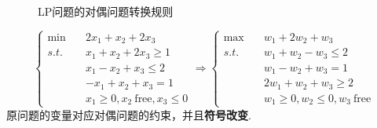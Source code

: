 \begin{remark}
\begin{itemize}
\begin{figure}[htbp]
            \caption{LP问题的对偶问题转换规则 \label{fig2}}
        \end{figure}
        \[\begin{cases}
            \min \quad & 2x_1 + x_2 + 2x_3\\
            s.t. \quad & x_1 + x_2 + 2x_3 \ge 1\\
            &x_1 - x_2 + x_3 \le 2\\
            &-x_1 + x_2 + x_3 = 1\\
            &x_1 \ge 0, x_2 \ \text{free}, x_3 \le 0
        \end{cases} \Longrightarrow \begin{cases}
            \max \quad & w_1 + 2w_2 + w_3\\
            s.t. \quad & w_1 + w_2 - w_3 \le 2\\
            &w_1 - w_2 + w_3 = 1\\
            &2w_1 + w_2 + w_3 \ge 2\\
            &w_1 \ge 0, w_2 \le 0, w_3 \ \text{free}
        \end{cases}\]
        原问题的变量对应对偶问题的约束，并且\textbf{符号改变}.
    \end{itemize}
\end{remark}

